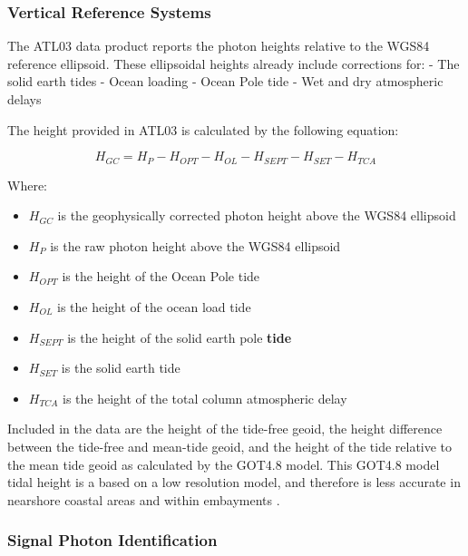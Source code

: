 \hypertarget{vertical-reference-systems}{%
  \subsubsection{Vertical Reference
    Systems}\label{vertical-reference-systems}}

The ATL03 data product reports the photon heights relative to the WGS84
reference ellipsoid. These ellipsoidal heights already include
corrections for: - The solid earth tides - Ocean loading - Ocean Pole
tide - Wet and dry atmospheric delays

The height provided in ATL03 is calculated by the following equation:

\[H_{GC} =  H_{P} - H_{OPT} - H_{OL} - H_{SEPT} - H_{SET} - H_{TCA}\]

Where:

\begin{itemize}

  \item
        \(H_{GC}\) is the geophysically corrected photon height above the
        WGS84 ellipsoid
  \item
        \(H_{P}\) is the raw photon height above the WGS84 ellipsoid
  \item
        \(H_{OPT}\) is the height of the Ocean Pole tide
  \item
        \(H_{OL}\) is the height of the ocean load tide
  \item
        \(H_{SEPT}\) is the height of the solid earth pole \textbf{tide}
  \item
        \(H_{SET}\) is the solid earth tide
  \item
        \(H_{TCA}\) is the height of the total column atmospheric delay
\end{itemize}

Included in the data are the height of the tide-free geoid, the height
difference between the tide-free and mean-tide geoid, and the height of
the tide relative to the mean tide geoid as calculated by the GOT4.8
model. This GOT4.8 model tidal height is a based on a low resolution
model, and therefore is less accurate in nearshore coastal areas and
within embayments \cite{Neumann2019e}.

\hypertarget{signal-photon-identification}{%
  \subsubsection{Signal Photon
    Identification}\label{signal-photon-identification}}

